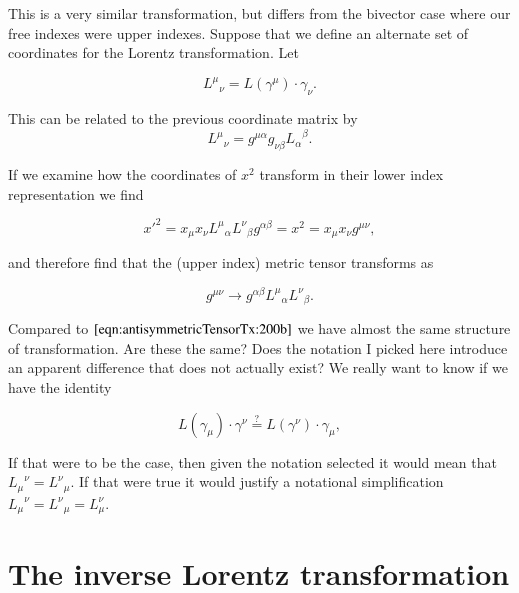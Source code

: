 This is a very similar transformation, but differs from the bivector case where our free indexes were upper indexes.  Suppose that we define an alternate set of coordinates for the Lorentz transformation.  Let

\begin{equation}\label{eqn:antisymmetricTensorTx:380}
{L^\mu}_\nu = L(\gamma^\mu) \cdot \gamma_\nu.
\end{equation}

This can be related to the previous coordinate matrix by
\begin{equation}\label{eqn:antisymmetricTensorTx:390}
{L^\mu}_\nu = g^{\mu \alpha } g_{\nu \beta } {L_\alpha}^\beta. 
\end{equation}

If we examine how the coordinates of $x^2$ transform in their lower index representation we find

\begin{equation}\label{eqn:antisymmetricTensorTx:400}
{x'}^2 = x_\mu x_\nu {L^\mu}_\alpha {L^\nu}_\beta g^{\alpha \beta} = x^2 = x_\mu x_\nu g^{\mu \nu},
\end{equation}

and therefore find that the (upper index) metric tensor transforms as

\begin{equation}\label{eqn:antisymmetricTensorTx:410}
g^{\mu \nu} \rightarrow
g^{\alpha \beta}
{L^\mu}_\alpha {L^\nu}_\beta .
\end{equation}

Compared to $\ref{eqn:antisymmetricTensorTx:200b}$ we have almost the same structure of transformation.  Are these the same?  Does the notation I picked here introduce an apparent difference that does not actually exist?  We really want to know if we have the identity

\begin{equation}\label{eqn:antisymmetricTensorTx:420}
L(\gamma_\mu) \cdot \gamma^\nu
\stackrel{?}{=}
L(\gamma^\nu) \cdot \gamma_\mu,
\end{equation}

If that were to be the case, then given the notation selected it would mean that ${L_\mu}^\nu = {L^\nu}_\mu$.  If that were true it would justify a notational simplification ${L_\mu}^\nu = {L^\nu}_\mu = L^\nu_\mu$.

\section{The inverse Lorentz transformation}

